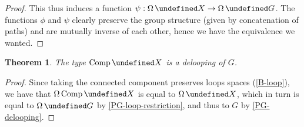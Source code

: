 \documentclass[10pt,a4paper]{amsart}
\newtheorem{theorem}{Theorem}
\theoremstyle{definition}
\newcommand{\freegroup}[1]{#1^*} %
\newcommand{\transport}[1]{#1^\to} %
\newcommand{\Comp}{\operatorname{Comp}} %
\newcommand{\Loop}{\operatorname{\Omega}} %
\let\P\undefined
\newcommand{\P}[1]{\operatorname{P}_{#1}} %
\begin{document}
\begin{proof}
  This thus induces a function $\psi:\Loop \P X\to\Loop\P G$. The functions
  $\phi$ and $\psi$ clearly preserve the group structure (given by
  concatenation of paths) and are mutually inverse of each other, hence we have the equivalence we wanted.
\end{proof}


\begin{theorem}
  \label{generated-delooping}
  The type $\Comp \P X$ is a delooping of $G$.
\end{theorem}

\begin{proof}
  Since taking the connected component preserves loops spaces (\cref{B-loop}),
  we have that $\Loop\Comp\P X$ is equal to $\Loop\P X$, which in turn is equal
  to $\Loop\P G$ by \cref{PG-loop-restriction}, and thus to $G$ by
  \cref{PG-delooping}.
\end{proof}
\end{document}
